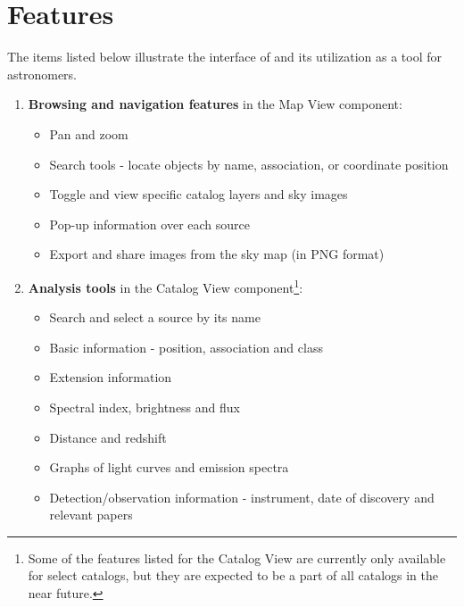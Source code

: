 \renewcommand{\thefootnote}{\fnsymbol{footnote}}

\section{Features}

The items listed below illustrate the interface of \gammasky and its utilization as a tool for astronomers.

\begin{enumerate}

\item \textbf{Browsing and navigation features} in the Map View component:

\begin{itemize}
\item Pan and zoom
\item Search tools - locate objects by name, association, or coordinate position
\item Toggle and view specific catalog layers and sky images
\item Pop-up information over each source
\item Export and share images from the sky map (in PNG format)
\end{itemize}

\item \textbf{Analysis tools} in the Catalog View component\footnote[1]{Some of the features listed for the Catalog View are currently only available for select catalogs, but they are expected to be a part of all catalogs in the near future.}:

\begin{itemize}

\item Search and select a source by its name
\item Basic information - position, association and class
\item Extension information
\item Spectral index, brightness and flux
\item Distance and redshift
\item Graphs of light curves and emission spectra
\item Detection/observation information - instrument, date of discovery and relevant papers

\end{itemize}

\end{enumerate}
